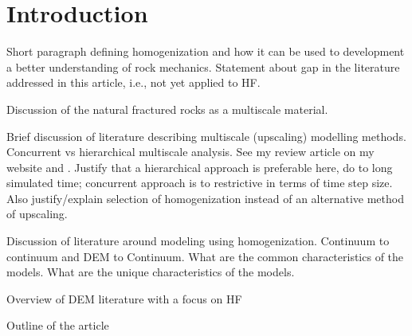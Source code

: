 \section{Introduction}
Short paragraph defining homogenization and how it can be used to development a better understanding of rock mechanics.  Statement about gap in the literature addressed in this article, i.e., not yet applied to HF.

Discussion of the natural fractured rocks as a multiscale material.

Brief discussion of literature describing multiscale (upscaling)  modelling methods.  Concurrent vs hierarchical multiscale analysis.  See my review article on my website and \cite{Gracie_2011}. Justify that a hierarchical approach is preferable here, do to long simulated time; concurrent approach is to restrictive in terms of time step size. Also justify/explain selection of homogenization instead of an alternative method of upscaling.

Discussion of literature around modeling using homogenization. Continuum to continuum and DEM to Continuum.  What are the common characteristics of the models. What are the unique characteristics of the models.  

Overview of DEM literature with a focus on HF

Outline of the article